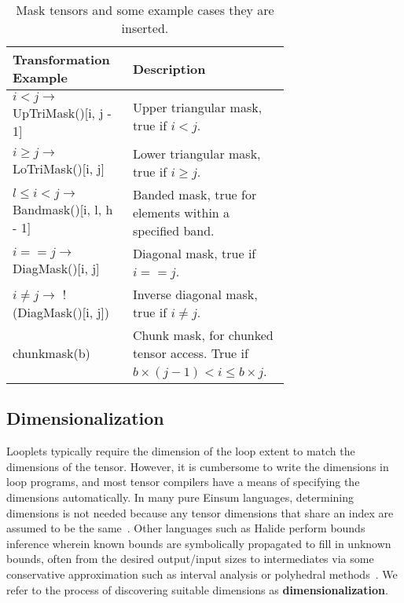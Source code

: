     \begin{table}[h]
        \scriptsize
        \centering
        \begin{tabular}{|>{\raggedright\arraybackslash}m{0.3\linewidth}|>{\raggedright\arraybackslash}m{0.4\linewidth}|}
        \hline
        \textbf{Transformation Example} & \textbf{Description} \\
        \hline
        $i < j \rightarrow$ UpTriMask()[i, j - 1] & Upper triangular mask, true if $i < j$. \\
        \hline
        $i \geq j \rightarrow$ LoTriMask()[i, j] & Lower triangular mask, true if $i \geq j$. \\
        \hline
        $l \leq i < j \rightarrow$ Bandmask()[i, l, h - 1] & Banded mask, true for elements within a specified band. \\
        \hline
        $i == j \rightarrow$ DiagMask()[i, j] & Diagonal mask, true if $i == j$. \\
        \hline
        $i \neq j \rightarrow$ !(DiagMask()[i, j]) & Inverse diagonal mask, true if $i \neq j$. \\
        \hline
        chunkmask(b) & Chunk mask, for chunked tensor access. True if $b \times (j - 1) < i \leq b \times j$. \\
        \hline
        \end{tabular}
        \caption{Mask tensors and some example cases they are inserted.}
        \label{table:masks}
    \end{table}
    
\subsection{Dimensionalization}
    Looplets typically require the dimension of the loop extent to match the dimensions of the tensor. 
    However, it is cumbersome to write the dimensions
    in loop programs, and most tensor compilers have a means of specifying the dimensions automatically.
    In many pure Einsum languages, determining dimensions
    is not needed because any tensor dimensions that share an index are assumed to be the same~\cite{kjolstad_tensor_2017}.
    Other languages such as Halide perform bounds inference wherein
    known bounds are symbolically propagated to fill in unknown bounds, often from the desired output/input sizes to intermediates via some conservative approximation such as interval analysis or polyhedral methods~\cite{ragan-kelley_halide_2013, grosser2012polly}.
    We refer to the process of discovering suitable
    dimensions as \textbf{dimensionalization}. 

